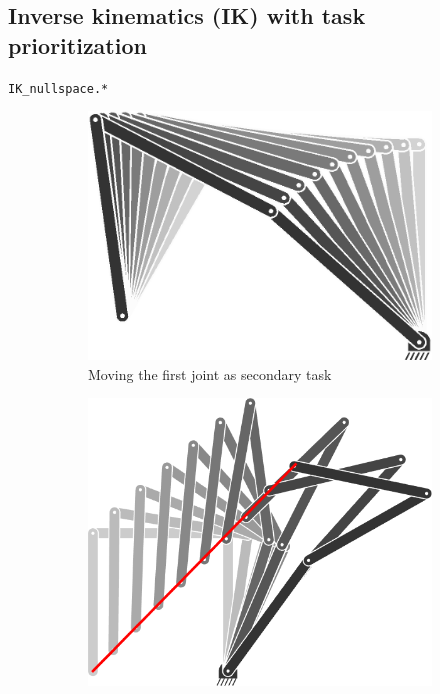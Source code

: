\documentclass[10pt,a4paper]{article} %
\newcommand{\filename}[1]{\colorbox{rr2}{\color{white}\texttt{#1}}}
\begin{document}
\subsection{Inverse kinematics (IK) with task prioritization}\label{sec:IK_nullspace}
\begin{flushright}
\filename{IK\_nullspace.*}
\end{flushright}

\begin{figure}
\centering
\begin{subfigure}[b]{.20\textwidth}
	\centering
	\includegraphics[width=.9\textwidth]{images/IK_nullspace01.png}
	\caption{Moving the first joint as secondary task}
	\label{fig:nullspace1}
\end{subfigure}
\hfill
\begin{subfigure}[b]{.23\textwidth}
	\centering
	\includegraphics[width=.9\textwidth]{images/IK_nullspace02.png}

\end{subfigure}
\end{figure}
\end{document}
